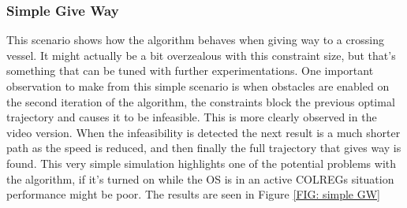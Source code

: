 \subsubsection{Simple Give Way}
This scenario shows how the algorithm behaves when giving way to a crossing vessel. It might actually be a bit overzealous with this
constraint size, but that's something that can be tuned with further experimentations. One important observation to make from this
simple scenario is when obstacles are enabled on the second iteration of the algorithm, the constraints block the previous optimal
trajectory and causes it to be infeasible. This is more clearly observed in the video version. When the infeasibility is detected
the next result is a much shorter path as the speed is reduced, and then finally the full trajectory that gives way is found.
This very simple simulation highlights one of the potential problems with the algorithm, if it's turned on while the OS is in an active
COLREGs situation performance might be poor. The results are seen in Figure \ref{FIG: simple GW}


